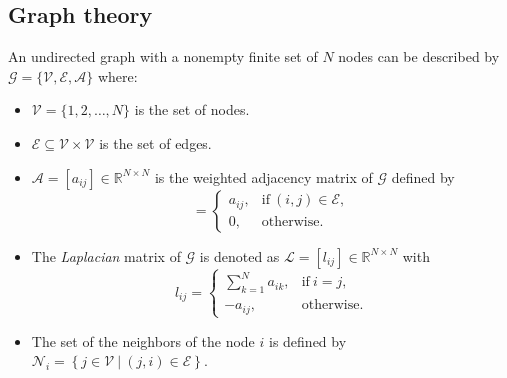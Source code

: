\documentclass{ifacconf}
\def\V{\mathcal{V}} %
\def\E{\mathcal{E}} %
\def\G{\mathcal{G}} %
\def\A{\mathcal{A}} %
\def\L{\mathcal{L}} %
\def\N{\mathcal{N}} %
\begin{document}
\subsection{Graph theory}\label{sec_notation}
\vspace*{-0.3cm}

%
An undirected graph with a nonempty finite set of $N$ nodes can be described by $\G =\{\V,\E,\A\}$ where:
\begin{itemize}
    \item $\V = \{1, 2, \dots, N\}$ is the set of nodes.
    \item $\E \subseteq \V \times \V$ is the set of edges.
    \item $\A = [a_{ij}] \in \mathbb{R}^{N \times N}$ is the weighted adjacency matrix of $\G$ defined by
    \begin{equation}
        [a_{ij}] = \begin{cases}
            a_{ij}, & \text{if}\ (i,j) \in \E , \\
            0, & \text{otherwise}.
        \end{cases}
    \end{equation}
    \item The {\it Laplacian} matrix of $\G$ is denoted as $\L = [l_{ij}] \in \mathbb{R}^{N \times N}$ with
    \begin{equation}
        l_{ij} = \begin{cases}
            \sum_{k=1}^{N}a_{ik}, & \text{if}\  i = j , \\
            -a_{ij}, & \text{otherwise}.
        \end{cases}
    \end{equation}
    \item The set of the neighbors of the node $i$ is defined by $\N_{i} =  \left\{j \in \V \ | \ \left( j, i \right) \in \E \right\}$.
\end{itemize}
\end{document}
